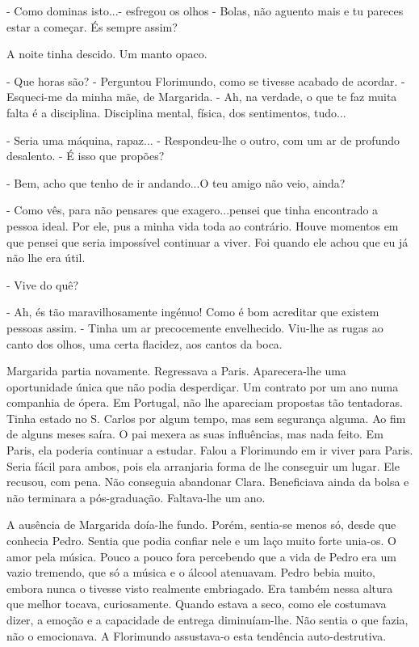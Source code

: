 - Como dominas isto...- esfregou os olhos - Bolas, não aguento mais e tu
pareces estar a começar. És sempre assim?

A noite tinha descido. Um manto opaco.

- Que horas são? - Perguntou Florimundo, como se tivesse acabado de
acordar. - Esqueci-me da minha mãe, de Margarida. - Ah, na verdade, o
que te faz muita falta é a disciplina. Disciplina mental, física, dos
sentimentos, tudo...

- Seria uma máquina, rapaz... - Respondeu-lhe o outro, com um ar de
profundo desalento. - É isso que propões?

- Bem, acho que tenho de ir andando...O teu amigo não veio, ainda?

- Como vês, para não pensares que exagero...pensei que tinha encontrado
a pessoa ideal. Por ele, pus a minha vida toda ao contrário. Houve
momentos em que pensei que seria impossível continuar a viver. Foi
quando ele achou que eu já não lhe era útil.

- Vive do quê?

- Ah, és tão maravilhosamente ingénuo! Como é bom acreditar que existem
pessoas assim. - Tinha um ar precocemente envelhecido. Viu-lhe as rugas
ao canto dos olhos, uma certa flacidez, aos cantos da boca.

Margarida partia novamente. Regressava a Paris. Aparecera-lhe uma
oportunidade única que não podia desperdiçar. Um contrato por um ano
numa companhia de ópera. Em Portugal, não lhe apareciam propostas tão
tentadoras. Tinha estado no S. Carlos por algum tempo, mas sem segurança
alguma. Ao fim de alguns meses saíra. O pai mexera as suas influências,
mas nada feito. Em Paris, ela poderia continuar a estudar. Falou a
Florimundo em ir viver para Paris. Seria fácil para ambos, pois ela
arranjaria forma de lhe conseguir um lugar. Ele recusou, com pena. Não
conseguia abandonar Clara. Beneficiava ainda da bolsa e não terminara a
pós-graduação. Faltava-lhe um ano.

A ausência de Margarida doía-lhe fundo. Porém, sentia-se menos só, desde
que conhecia Pedro. Sentia que podia confiar nele e um laço muito forte
unia-os. O amor pela música. Pouco a pouco fora percebendo que a vida de
Pedro era um vazio tremendo, que só a música e o álcool atenuavam. Pedro
bebia muito, embora nunca o tivesse visto realmente embriagado. Era
também nessa altura que melhor tocava, curiosamente. Quando estava a
seco, como ele costumava dizer, a emoção e a capacidade de entrega
diminuíam-lhe. Não sentia o que fazia, não o emocionava. A Florimundo
assustava-o esta tendência auto-destrutiva.

